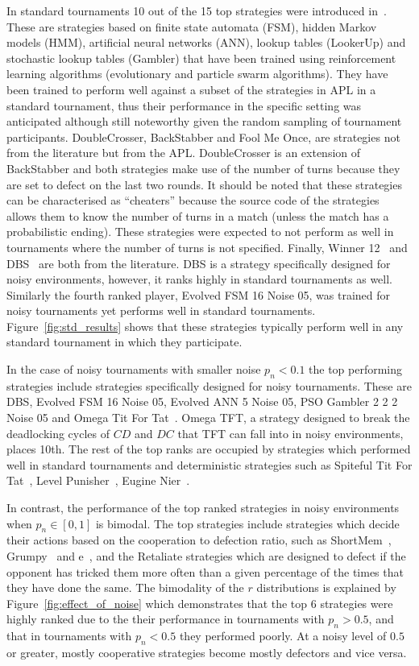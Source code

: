 \documentclass{article}
\begin{document}
In standard tournaments 10 out of the 15 top strategies were introduced
in~\cite{Harper2017}. These are strategies based on finite state automata (FSM),
hidden Markov models (HMM), artificial neural networks (ANN), lookup tables
(LookerUp) and stochastic lookup tables (Gambler) that have been trained using
reinforcement learning algorithms (evolutionary and particle swarm algorithms).
They have been trained to perform well against a subset of the strategies
in APL in a standard tournament, thus their performance in the
specific setting was anticipated although still noteworthy given the random
sampling of tournament participants. DoubleCrosser, BackStabber and Fool Me Once, are
strategies not from the literature but from the APL. DoubleCrosser is an extension
of BackStabber and both strategies make use of the number of turns because they are
set to defect on the last two rounds. It should be noted that these
strategies can be characterised as ``cheaters'' because the source code of the strategies
allows them to know the number of turns in a match (unless the match has a probabilistic ending). These strategies were expected to not perform as well in
tournaments where the number of turns is not specified. Finally, Winner
12~\cite{mathieu2017} and DBS~\cite{Au2006} are both from the literature.
DBS is a strategy specifically designed for noisy environments, however, it ranks
highly in standard tournaments as well. Similarly the fourth ranked player,
Evolved FSM 16 Noise 05, was
trained for noisy tournaments yet performs well in standard tournaments.
Figure~\ref{fig:std_results} shows that these strategies typically perform
well in any standard tournament in which they participate.

In the case of noisy tournaments with smaller noise \(p_n < 0.1\) the top
performing strategies
include strategies specifically designed for noisy tournaments. These are DBS,
Evolved FSM 16 Noise 05, Evolved ANN 5 Noise 05, PSO Gambler 2 2 2 Noise 05 and
Omega Tit For Tat~\cite{kendall2007iterated}. Omega TFT, a strategy designed
to break the deadlocking cycles of \(CD\) and \(DC\) that TFT can fall into in noisy
environments, places 10th. The rest of the top ranks are
occupied by strategies which performed well in standard tournaments and
deterministic strategies such as Spiteful Tit For Tat~\cite{prison}, Level
Punisher~\cite{Eckhart2015}, Eugine Nier~\cite{lesswrong}.

In contrast, the performance of the top ranked strategies in noisy environments
when \(p_n\in [0, 1]\) is bimodal. The top strategies include strategies which
decide their actions based on the cooperation to defection ratio, such as
ShortMem~\cite{Andre2013}, Grumpy~\cite{axelrodproject} and
e~\cite{axelrodproject}, and the Retaliate strategies which are designed to
defect if the opponent has tricked them more often than a given percentage of the times that
they have done the same. The bimodality of the \(r\) distributions is explained
by Figure~\ref{fig:effect_of_noise} which demonstrates that the top 6 strategies
were highly ranked due to the their performance in tournaments with \(p_n>0.5\),
and that in tournaments with \(p_n<0.5\) they
performed poorly. At a noisy level of \(0.5\) or greater, mostly cooperative strategies
become mostly defectors and vice versa.
\end{document}
